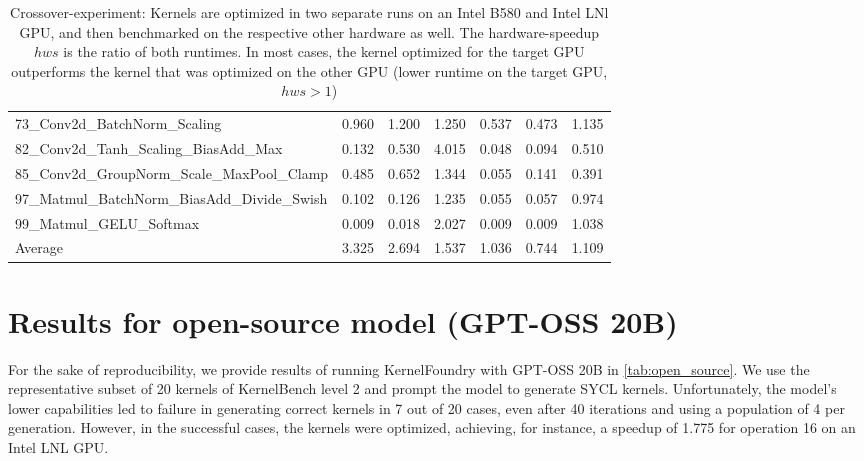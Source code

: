 \begin{table}[b!ht]
{\begin{tabular}{l|rr|r|rr|r}
73\_Conv2d\_BatchNorm\_Scaling & 0.960 & 1.200 & 1.250 & 0.537 & 0.473 & 1.135 \\
82\_Conv2d\_Tanh\_Scaling\_BiasAdd\_Max & 0.132 & 0.530 & 4.015 & 0.048 & 0.094 & 0.510 \\
85\_Conv2d\_GroupNorm\_Scale\_MaxPool\_Clamp & 0.485 & 0.652 & 1.344 & 0.055 & 0.141 & 0.391 \\
97\_Matmul\_BatchNorm\_BiasAdd\_Divide\_Swish & 0.102 & 0.126 & 1.235 & 0.055 & 0.057 & 0.974 \\
99\_Matmul\_GELU\_Softmax & 0.009 & 0.018 & 2.027 & 0.009 & 0.009 & 1.038 \\
\midrule
Average & 3.325 & 2.694 & 1.537 & 1.036 & 0.744 & 1.109 \\
\bottomrule
\end{tabular}
}
\caption{Crossover-experiment: Kernels are optimized in two separate runs on an Intel B580 and Intel LNl GPU, and then benchmarked on the respective other hardware as well. The hardware-speedup $hws$ is the ratio of both runtimes. In most cases, the kernel optimized for the target GPU outperforms the kernel that was optimized on the other GPU (lower runtime on the target GPU, $hws>1$)}
\label{tab:lnl_vs_bmg}
\end{table}

\newpage 

\section{Results for open-source model (GPT-OSS 20B)}\label{app:opensource}

For the sake of reproducibility, we provide results of running KernelFoundry with GPT-OSS 20B in \autoref{tab:open_source}. We use the representative subset of 20 kernels of KernelBench level 2 and prompt the model to generate SYCL kernels. Unfortunately, the model's lower capabilities led to failure in generating correct kernels in 7 out of 20 cases, even after 40 iterations and using a population of 4 per generation. However, in the successful cases, the kernels were optimized, achieving, for instance, a speedup of 1.775 for operation 16 on an Intel LNL GPU.

